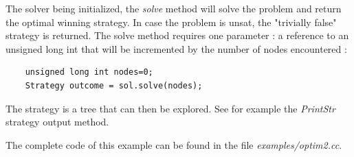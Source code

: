 \documentclass{article}
\begin{document}
The solver being initialized, the {\em solve} method will solve the problem and return the optimal winning strategy. In case the problem is unsat, the "trivially false" strategy is returned. 
The solve method requires one parameter : a reference to an unsigned long int that will be incremented by the number of nodes encountered : 
{\small
\begin{verbatim}
    unsigned long int nodes=0;    
    Strategy outcome = sol.solve(nodes);
\end{verbatim}
}

The strategy is a tree that can then be explored. See for example the {\em PrintStr} strategy output method. 

The complete code of this example can be found in the file {\em examples/optim2.cc}.
\newpage



\end{document}

